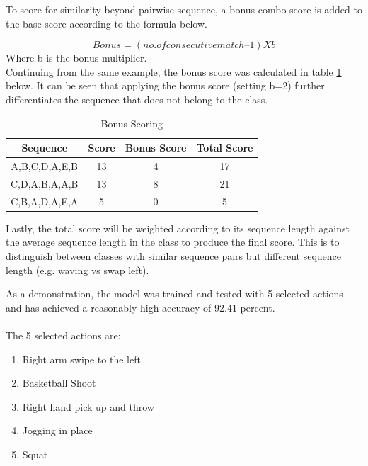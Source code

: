 \documentclass[conference]{IEEEtran}
\begin{document}
To score for similarity beyond pairwise sequence, a bonus combo score is added to the base score according to the formula below. 

\begin{equation}
Bonus = (no. of consecutive match – 1) X b
\end{equation}
Where b is the bonus multiplier. \\

Continuing from the same example, the bonus score was calculated in table \ref{tbl:total_score} below. It can be seen that applying the bonus score (setting b=2) further differentiates the sequence that does not belong to the class. 

\begin{table}[H] 
\begin{center}
\caption{Bonus Scoring} \label{tbl:total_score}
\begin{tabular}{|c|c|c|c|}
\hline
Sequence & Score & Bonus Score & Total Score\\
\hline
A,B,C,D,A,E,B  & 13 & 4 & 17  \\
\hline
C,D,A,B,A,A,B & 13 & 8 & 21  \\
\hline
C,B,A,D,A,E,A & 5 & 0 & 5  \\
\hline
\end{tabular}
\end{center}
\end{table}

Lastly, the total score will be weighted according to its sequence length against the average sequence length in the class to produce the final score. This is to distinguish between classes with similar sequence pairs but different sequence length (e.g. waving vs swap left).

As a demonstration, the model was trained and tested with 5 selected actions and has achieved a reasonably high accuracy of 92.41 percent.\\ \\
The 5 selected actions are:

\begin{enumerate}
\item Right arm swipe to the left
\item Basketball Shoot
\item Right hand pick up and throw
\item Jogging in place
\item Squat
\end{enumerate}
\end{document}
